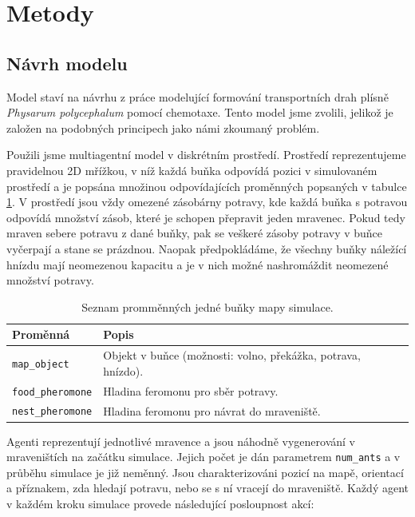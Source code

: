 \documentclass[10pt,a4paper,twocolumn]{article}
\begin{document}
\section{Metody}

\subsection{Návrh modelu}
\label{subsec:model_setup}
Model staví na návrhu z práce \citet{jones2010characteristics}
modelující formování transportních drah plísně \emph{Physarum polycephalum}
pomocí chemotaxe. Tento model jsme zvolili, jelikož je založen na podobných 
principech jako námi zkoumaný problém.

Použili jsme multiagentní model v diskrétním prostředí. Prostředí reprezentujeme 
pravidelnou 2D mřížkou, v níž každá buňka odpovídá pozici v simulovaném prostředí a je 
popsána množinou odpovídajících proměnných popsaných v tabulce \ref{table:mapa}.
V prostředí jsou vždy omezené zásobárny potravy, kde každá buňka s potravou
odpovídá množství zásob, které je schopen přepravit jeden mravenec. Pokud
tedy mraven sebere potravu z dané buňky, pak se veškeré zásoby potravy v 
buňce vyčerpají a stane se prázdnou. Naopak předpokládáme, že všechny
buňky náležící hnízdu mají neomezenou kapacitu a je v nich možné 
nashromáždit neomezené množství potravy.


\begin{table}[t]
  \centering %
  \begin{tabular}{l p{5cm}}
  \toprule
  Proměnná & Popis \\
  \midrule
    \texttt{map\_object} & Objekt v buňce (možnosti:
    volno, překážka, potrava, hnízdo). \\
    \texttt{food\_pheromone} & Hladina feromonu pro sběr potravy.\\
    \texttt{nest\_pheromone} & Hladina feromonu pro návrat do mraveniště.\\	
  \bottomrule
  \end{tabular}
  \caption{Seznam promměnných jedné buňky mapy simulace.} \label{table:mapa} 
\end{table}


Agenti reprezentují jednotlivé mravence a jsou náhodně 
vygenerování v mraveništích na začátku simulace. Jejich počet je dán 
parametrem \texttt{num\_ants} a 
v průběhu simulace je již neměnný. Jsou charakterizováni pozicí na mapě,
orientací a příznakem, zda hledají potravu, nebo se s ní vracejí do mraveniště.
Každý agent v každém kroku simulace provede následující posloupnost akcí:
\end{document}
